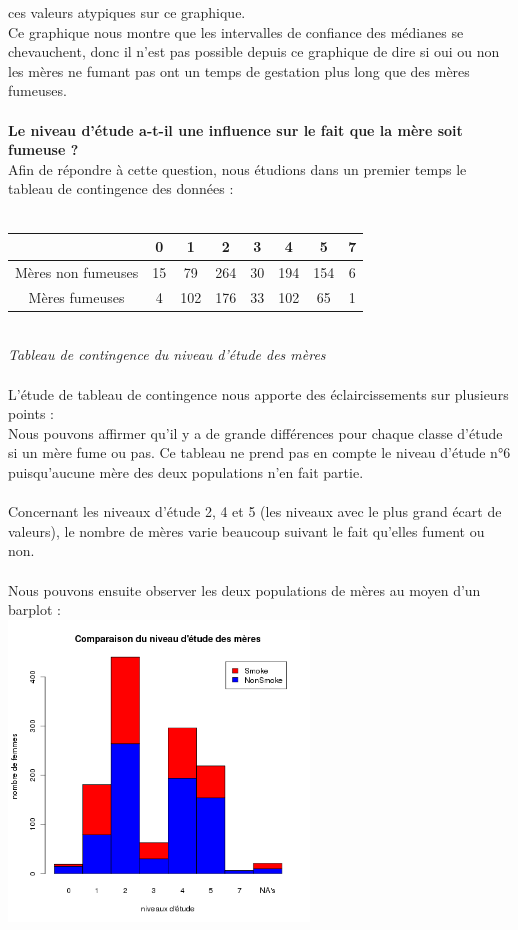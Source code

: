 \documentclass[a4paper, 10pt]{article}
\begin{document}
ces valeurs atypiques sur ce graphique.\\
Ce graphique nous montre que les intervalles de confiance des m\'edianes se chevauchent, donc il n'est pas possible depuis ce graphique de
dire si oui ou non les m\`eres ne fumant pas ont un temps de gestation plus long que des m\`eres fumeuses.\\ \\
\textbf{Le niveau d'\'etude a-t-il une influence sur le fait que la m\`ere soit fumeuse ?}\\
Afin de r\'epondre \`a cette question, nous \'etudions dans un premier temps le tableau de contingence des donn\'ees :\\ \\
\begin{tabular}{|c|c|c|c|c|c|c|c|}
\hline
 & 0 & 1 & 2 & 3 & 4 & 5 & 7\\
\hline
M\`eres non fumeuses & 15 & 79 & 264 & 30 & 194 & 154 & 6 \\
\hline
M\`eres fumeuses & 4 & 102 & 176 & 33 & 102 & 65 & 1 \\
\hline
\end{tabular}\\
\textit{Tableau de contingence du niveau d'étude des mères}\\ \\
L'\'etude de tableau de contingence nous apporte des \'eclaircissements sur plusieurs points :\\
Nous pouvons affirmer qu'il y a de grande diff\'erences pour chaque classe d'\'etude si un m\`ere fume ou pas.
Ce tableau ne prend pas en compte le niveau d'\'etude n°6 puisqu'aucune m\`ere des deux populations n'en fait partie.\\ \\
Concernant les niveaux d'\'etude 2, 4 et 5 (les niveaux avec le plus grand \'ecart de valeurs), le nombre de m\`eres varie beaucoup
suivant le fait qu'elles fument ou non.\\ \\
Nous pouvons ensuite observer les deux populations de m\`eres au moyen d'un barplot :\\
\includegraphics[height = 8cm, width = 8cm]{plots/barplot_etude_smoke.png}\\
\end{document}
